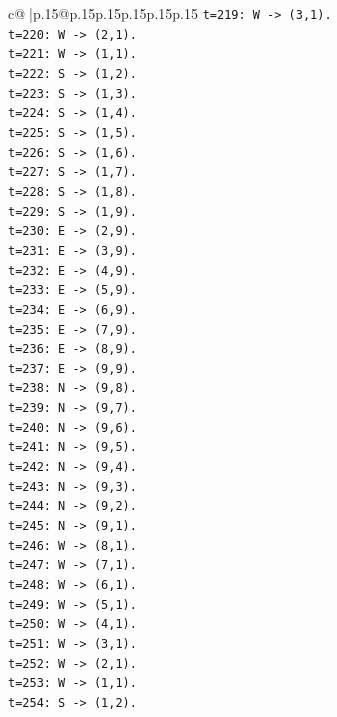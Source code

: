 \documentclass{article}
\begin{document}
{\begin{supertabular}{c@{$\;$}|p{.15\linewidth}@{}p{.15\linewidth}p{.15\linewidth}p{.15\linewidth}p{.15\linewidth}p{.15\linewidth}}
{{{\texttt{t=219: W {-}> (3,1).} \\
\texttt{t=220: W {-}> (2,1).} \\
\texttt{t=221: W {-}> (1,1).} \\
\texttt{t=222: S {-}> (1,2).} \\
\texttt{t=223: S {-}> (1,3).} \\
\texttt{t=224: S {-}> (1,4).} \\
\texttt{t=225: S {-}> (1,5).} \\
\texttt{t=226: S {-}> (1,6).} \\
\texttt{t=227: S {-}> (1,7).} \\
\texttt{t=228: S {-}> (1,8).} \\
\texttt{t=229: S {-}> (1,9).} \\
\texttt{t=230: E {-}> (2,9).} \\
\texttt{t=231: E {-}> (3,9).} \\
\texttt{t=232: E {-}> (4,9).} \\
\texttt{t=233: E {-}> (5,9).} \\
\texttt{t=234: E {-}> (6,9).} \\
\texttt{t=235: E {-}> (7,9).} \\
\texttt{t=236: E {-}> (8,9).} \\
\texttt{t=237: E {-}> (9,9).} \\
\texttt{t=238: N {-}> (9,8).} \\
\texttt{t=239: N {-}> (9,7).} \\
\texttt{t=240: N {-}> (9,6).} \\
\texttt{t=241: N {-}> (9,5).} \\
\texttt{t=242: N {-}> (9,4).} \\
\texttt{t=243: N {-}> (9,3).} \\
\texttt{t=244: N {-}> (9,2).} \\
\texttt{t=245: N {-}> (9,1).} \\
\texttt{t=246: W {-}> (8,1).} \\
\texttt{t=247: W {-}> (7,1).} \\
\texttt{t=248: W {-}> (6,1).} \\
\texttt{t=249: W {-}> (5,1).} \\
\texttt{t=250: W {-}> (4,1).} \\
\texttt{t=251: W {-}> (3,1).} \\
\texttt{t=252: W {-}> (2,1).} \\
\texttt{t=253: W {-}> (1,1).} \\
\texttt{t=254: S {-}> (1,2).} \\
}}}
\end{supertabular}}
\end{document}

